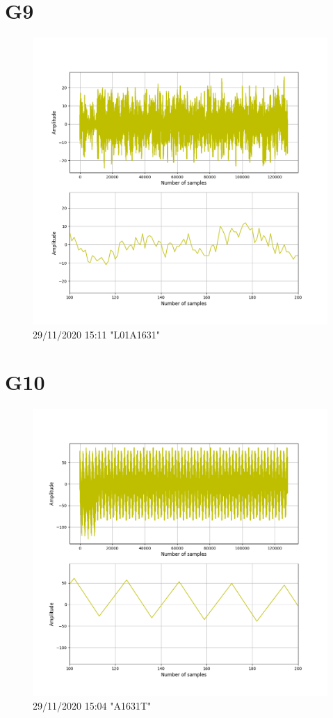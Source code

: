 \documentclass[hidelinks, 12pt, a4paper]{article}
\begin{document}
\section{G9}

\begin{figure}[h!]
\centering
	\includegraphics[height=.38\textheight, width=\textwidth]{assets/session2/g9.png}
	\caption{29/11/2020 15:11 "L01A1631"} 
\end{figure}

\section{G10}

\begin{figure}[h!]
\centering
	\includegraphics[height=.38\textheight, width=\textwidth]{assets/session2/g10.png}
    \caption{29/11/2020 15:04 "A1631T"}
\end{figure}
\end{document}
